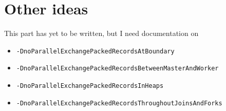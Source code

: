 \section{Other ideas}

This part has yet to be written, but I need documentation on 

\begin{itemize}
  \item \texttt{-DnoParallelExchangePackedRecordsAtBoundary}
  \item \texttt{-DnoParallelExchangePackedRecordsBetweenMasterAndWorker}
  \item \texttt{-DnoParallelExchangePackedRecordsInHeaps}
  \item \texttt{-DnoParallelExchangePackedRecordsThroughoutJoinsAndForks}
\end{itemize}

%



% 
% 

